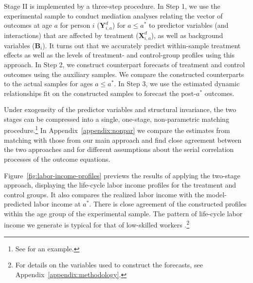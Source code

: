 Stage II is implemented by a three-step procedure. In Step 1, we use the experimental sample to conduct mediation analyses relating the vector of outcomes at age $a$ for person $i$ ($\bm{Y}^{d}_{i,a}$) for $a\leq a^*$ to predictor variables (and interactions) that are affected by treatment ($\bm{X}^{d}_{i,a}$), as well as background variables ($\bm{B}_i$). It turns out that we accurately predict within-sample treatment effects as well as the levels of treatment- and control-group profiles using this approach. In Step 2, we construct counterpart forecasts of treatment and control outcomes using the auxiliary samples. We compare the constructed counterparts to the actual samples for ages $a \leq a^\ast$. In Step 3, we use the estimated dynamic relationships fit on the constructed samples to forecast the post-$a^{\ast}$ outcomes.

Under exogeneity of the predictor variables and structural invariance, the two stages can be compressed into a single, one-stage, non-parametric matching procedure.\footnote{See \citet{Heckman_Ichimura_etal_1998_Econometrica} for an example.} In  Appendix~\ref{appendix:nonpar} we compare the estimates from matching with those from our main approach and find close agreement between the two approaches and for different assumptions about the serial correlation processes of the outcome equations.

Figure~\ref{fig:labor-income-profiles} previews the results of applying the two-stage approach, displaying the life-cycle labor income profiles for the treatment and control groups. It also compares the realized labor income with the model-predicted labor income at $a^*$. There is close agreement of the constructed profiles within the age group of the experimental sample. The pattern of life-cycle labor income we generate is typical for that of low-skilled workers \citep{Blundell-etal_2015_J-Pub-E,Gladden_Taber_2000_WageProgression,Sanders-Taber_2012_AR,Lagakos_Moll_etal_2016_LifeCycle_NBER}.\footnote{For details on the variables used to construct the forecasts, see  Appendix~\ref{appendix:methodology}.}

